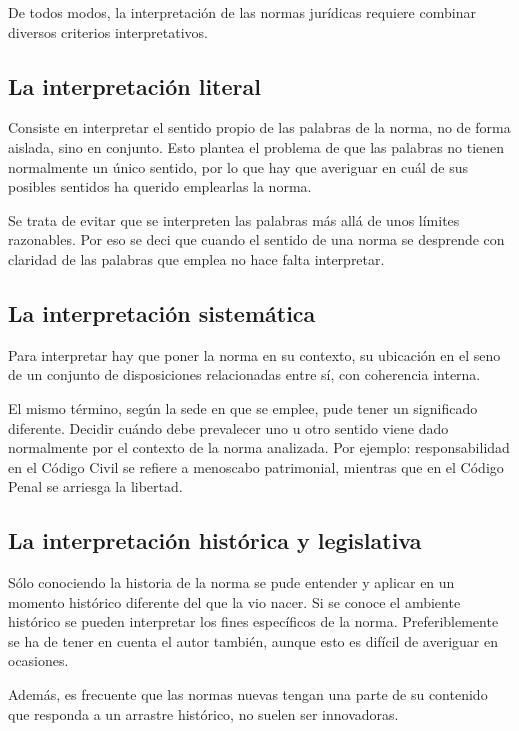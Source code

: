 \documentclass[a4paper,12pt]{report}
\begin{document}
De todos modos, la interpretación de las normas jurídicas requiere combinar diversos criterios interpretativos.

\subsection{La interpretación literal}

Consiste en interpretar el sentido propio de las palabras de la norma, no de forma aislada, sino en conjunto. Esto plantea el problema de que las palabras no tienen normalmente un único sentido, por lo que hay que averiguar en cuál de sus posibles sentidos ha querido emplearlas la norma.

Se trata de evitar que se interpreten las palabras más allá de unos límites razonables. Por eso se deci que cuando el sentido de una norma se desprende con claridad de las palabras que emplea no hace falta interpretar.

\subsection{La interpretación sistemática}

Para interpretar hay que poner la norma en su contexto, su ubicación en el seno de un conjunto de disposiciones relacionadas entre sí, con coherencia interna.

El mismo término, según la sede en que se emplee, pude tener un significado diferente. Decidir cuándo debe prevalecer uno u otro sentido viene dado normalmente por el contexto de la norma analizada. Por ejemplo: responsabilidad en el Código Civil se refiere a menoscabo patrimonial, mientras que en el Código Penal se arriesga la libertad.

\subsection{La interpretación histórica y legislativa}

Sólo conociendo la historia de la norma se pude entender y aplicar en un momento histórico diferente del que la vio nacer. Si se conoce el ambiente histórico se pueden interpretar los fines específicos de la norma. Preferiblemente se ha de tener en cuenta el autor también, aunque esto es difícil de averiguar en ocasiones.

Además, es frecuente que las normas nuevas tengan una parte de su contenido que responda a un arrastre histórico, no suelen ser innovadoras.
\end{document}
